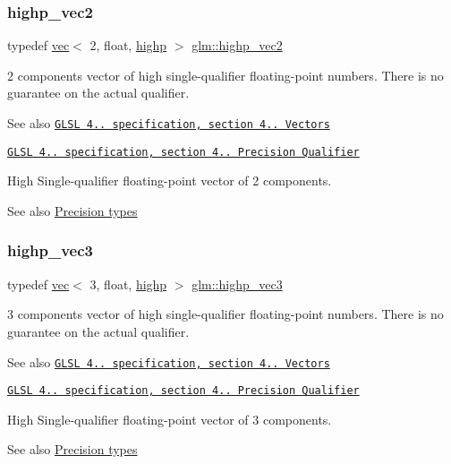 \subsubsection{\texorpdfstring{highp\+\_\+vec2}{highp\_vec2}}
{\footnotesize\ttfamily typedef \hyperlink{structglm_1_1vec}{vec}$<$ 2, float, \hyperlink{namespaceglm_a36ed105b07c7746804d7fdc7cc90ff25ac6f7eab42eacbb10d59a58e95e362074}{highp} $>$ \hyperlink{group__core__precision_gad588ab946806864499d6559c186ce3ba}{glm\+::highp\+\_\+vec2}}

2 components vector of high single-\/qualifier floating-\/point numbers. There is no guarantee on the actual qualifier.

\begin{DoxySeeAlso}{See also}
\href{http://www.opengl.org/registry/doc/GLSLangSpec.4.20.8.pdf}{\tt G\+L\+SL 4.. specification, section 4.. Vectors} 

\href{http://www.opengl.org/registry/doc/GLSLangSpec.4.20.8.pdf}{\tt G\+L\+SL 4.. specification, section 4.. Precision Qualifier}
\end{DoxySeeAlso}
High Single-\/qualifier floating-\/point vector of 2 components. \begin{DoxySeeAlso}{See also}
\hyperlink{group__core__precision}{Precision types} 
\end{DoxySeeAlso}
\mbox{\label{group__core__precision_ga37ff190d92f9be26223a5de4153b9133}} 
\subsubsection{\texorpdfstring{highp\+\_\+vec3}{highp\_vec3}}
{\footnotesize\ttfamily typedef \hyperlink{structglm_1_1vec}{vec}$<$ 3, float, \hyperlink{namespaceglm_a36ed105b07c7746804d7fdc7cc90ff25ac6f7eab42eacbb10d59a58e95e362074}{highp} $>$ \hyperlink{group__core__precision_ga37ff190d92f9be26223a5de4153b9133}{glm\+::highp\+\_\+vec3}}

3 components vector of high single-\/qualifier floating-\/point numbers. There is no guarantee on the actual qualifier.

\begin{DoxySeeAlso}{See also}
\href{http://www.opengl.org/registry/doc/GLSLangSpec.4.20.8.pdf}{\tt G\+L\+SL 4.. specification, section 4.. Vectors} 

\href{http://www.opengl.org/registry/doc/GLSLangSpec.4.20.8.pdf}{\tt G\+L\+SL 4.. specification, section 4.. Precision Qualifier}
\end{DoxySeeAlso}
High Single-\/qualifier floating-\/point vector of 3 components. \begin{DoxySeeAlso}{See also}
\hyperlink{group__core__precision}{Precision types} 
\end{DoxySeeAlso}
\mbox{\label{group__core__precision_ga27638826fa491205403b39198c49e9f5}} 

